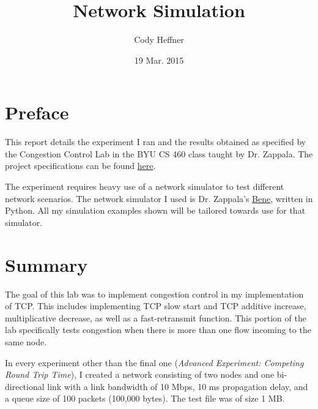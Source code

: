 \documentclass[11pt]{article}
\begin{document}
\lstset{
  language=Python,
  basicstyle=\small,          %
  keywordstyle=\bfseries,
  identifierstyle=,           %
  commentstyle=,              %
  stringstyle=\ttfamily,      %
  showstringspaces=false,     %
  numbers=left,
  numberstyle=\tiny,
  numbersep=5pt,
  frame=tb,
}

\newenvironment{absolutelynopagebreak}
  {\par\nobreak\vfil\penalty0\vfilneg
   \vtop\bgroup}
  {\par\xdef\tpd{\the\prevdepth}\egroup
   \prevdepth=\tpd}

\title{Network Simulation}

\author{Cody Heffner}

\date{19 Mar. 2015}

\maketitle

\section{Preface}

This report details the experiment I ran and the results obtained as specified by the Congestion Control Lab in the BYU CS 460 class taught by Dr. Zappala. The project specifications can be found \href{http://cs460.byu.edu/winter-2015/labs/congestion-control-part-2}{here}.

The experiment requires heavy use of a network simulator to test different network scenarios. The network simulator I used is Dr. Zappala's \href{https://github.com/zappala/bene}{Bene}, written in Python. All my simulation examples shown will be tailored towards use for that simulator.

\section{Summary}

The goal of this lab was to implement congestion control in my implementation of TCP. This includes implementing TCP slow start and TCP additive increase, multiplicative decrease, as well as a fast-retransmit function. This portion of the lab specifically tests congestion when there is more than one flow incoming to the same node.

In every experiment other than the final one (\emph{Advanced Experiment: Competing Round Trip Time}), I created a network consisting of two nodes and one bi-directional link with a link bandwidth of 10 Mbps, 10 ms propagation delay, and a queue size of 100 packets (100,000 bytes). The test file was of size 1 MB.
\end{document}
